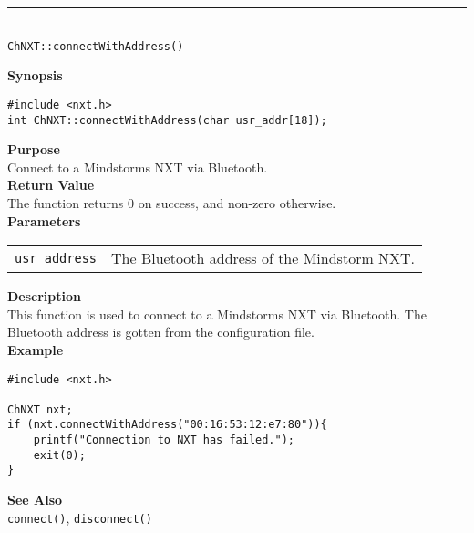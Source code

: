 \noindent
\vspace{5pt}
\rule{4.5in}{0.015in}\\
\noindent
{\LARGE \texttt{ChNXT::connectWithAddress()} }\\


\noindent
{\bf Synopsis}
\begin{lstlisting}
#include <nxt.h>
int ChNXT::connectWithAddress(char usr_addr[18]);
\end{lstlisting}

\noindent
{\bf Purpose}\\
Connect to a Mindstorms NXT via Bluetooth.\\

\noindent
{\bf Return Value}\\
The function returns 0 on success, and non-zero otherwise.\\

\noindent
{\bf Parameters}\\
\vspace{-0.1in}
\begin{description}
\item
\begin{tabular}{p{20mm}p{135mm}}
\texttt{usr\_address} & The Bluetooth address of the Mindstorm NXT.
\end{tabular}
\end{description}

\noindent
{\bf Description}\\
This function is used to connect to a Mindstorms NXT via Bluetooth. The Bluetooth address is gotten from the configuration file.\\

\noindent
{\bf Example}
\begin{lstlisting}
#include <nxt.h> 

ChNXT nxt;
if (nxt.connectWithAddress("00:16:53:12:e7:80")){
    printf("Connection to NXT has failed.");
    exit(0);
}
\end{lstlisting}

\noindent
{\bf See Also}\\
\texttt{connect()}, \texttt{disconnect()}\\
